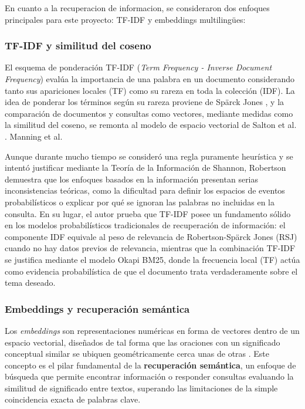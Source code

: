 En cuanto a la recuperacion de informacion, se consideraron dos enfoques principales para este proyecto: TF-IDF y embeddings multilingües:

\subsubsection{TF-IDF y similitud del coseno}
El esquema de ponderación TF-IDF (\textit{Term Frequency - Inverse Document Frequency}) evalúa la importancia de una palabra en un documento considerando tanto sus apariciones locales (TF) como su rareza en toda la colección (IDF).
La idea de ponderar los términos según su rareza proviene de Spärck Jones \cite{sparckjones1972idf}, y la comparación de documentos y consultas como vectores, mediante medidas como la similitud del coseno, se remonta al modelo de espacio vectorial de Salton et al. \cite{salton1975vsm}. Manning et al.

Aunque durante mucho tiempo se consideró una regla puramente heurística y se intentó justificar mediante la Teoría de la Información de Shannon, Robertson \cite{robertson2004idf} demuestra que los enfoques basados en la información presentan serias inconsistencias teóricas, como la dificultad para definir los espacios de eventos probabilísticos o explicar por qué se ignoran las palabras no incluidas en la consulta. En su lugar, el autor prueba que TF-IDF posee un fundamento sólido en los modelos probabilísticos tradicionales de recuperación de información: el componente IDF equivale al peso de relevancia de Robertson-Spärck Jones (RSJ) cuando no hay datos previos de relevancia, mientras que la combinación TF-IDF se justifica mediante el modelo Okapi BM25, donde la frecuencia local (TF) actúa como evidencia probabilística de que el documento trata verdaderamente sobre el tema deseado.

\subsubsection{Embeddings y recuperación semántica}
Los \textit{embeddings} son representaciones numéricas en forma de vectores dentro de un espacio vectorial, diseñados de tal forma que las oraciones con un significado conceptual similar se ubiquen geométricamente cerca unas de otras \cite{reimers2019sbert}. Este concepto es el pilar fundamental de la \textbf{recuperación semántica}, un enfoque de búsqueda que permite encontrar información o responder consultas evaluando la similitud de significado entre textos, superando las limitaciones de la simple coincidencia exacta de palabras clave.

